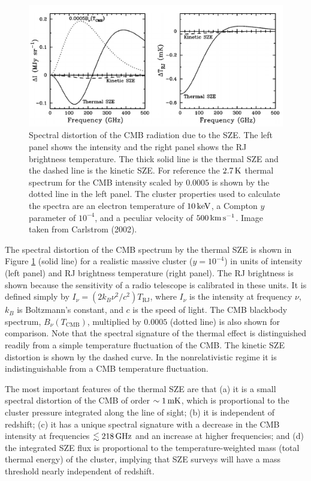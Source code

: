 \documentclass[a4paper,11pt]{article}
\begin{document}
\begin{figure}[t]
    \includegraphics[width=16cm]{figures/SZrealistic.png}
    \centering
    \caption{\footnotesize{Spectral distortion of the CMB radiation due to the SZE. The left panel shows the intensity and the right panel shows the RJ brightness temperature. The thick solid line is the thermal SZE and the dashed line is the kinetic SZE. For reference the $2.7\,{\rm K}$ thermal spectrum for the CMB intensity scaled by $0.0005$ is shown by the dotted line in the left panel. The cluster properties used to calculate the spectra are an electron temperature of $10\,{\rm keV}$, a Compton $y$ parameter of $10^{-4}$, and a peculiar velocity of $500\,{\rm km\,s^{-1}}$. Image taken from Carlstrom (2002).}}
    \label{fig:szrealistic}
\end{figure}

{\noindent}The spectral distortion of the CMB spectrum by the thermal SZE is shown in Figure \ref{fig:szrealistic} (solid line) for a realistic massive cluster ($y=10^{-4}$) in units of intensity (left panel) and RJ brightness temperature (right panel). The RJ brightness is shown because the sensitivity of a radio telescope is calibrated in these units. It is defined simply by $I_\nu=(2k_B\nu^2/c^2)T_\mathrm{RJ}$, where $I_\nu$ is the intensity at frequency $\nu$, $k_B$ is Boltzmann's constant, and $c$ is the speed of light. The CMB blackbody spectrum, $B_\nu(T_\mathrm{CMB})$, multiplied by $0.0005$ (dotted line) is also shown for comparison. Note that the spectral signature of the thermal effect is distinguished readily from a simple temperature fluctuation of the CMB. The kinetic SZE distortion is shown by the dashed curve. In the nonrelativistic regime it is indistinguishable from a CMB temperature fluctuation.

{\noindent}The most important features of the thermal SZE are that (a) it is a small spectral distortion of the CMB of order $\sim1\,{\rm mK}$, which is proportional to the cluster pressure integrated along the line of sight; (b) it is independent of redshift; (c) it has a unique spectral signature with a decrease in the CMB intensity at frequencies $\lesssim218\,{\rm GHz}$ and an increase at higher frequencies; and (d) the integrated SZE flux is proportional to the temperature-weighted mass (total thermal energy) of the cluster, implying that SZE surveys will have a mass threshold nearly independent of redshift.
\end{document}
